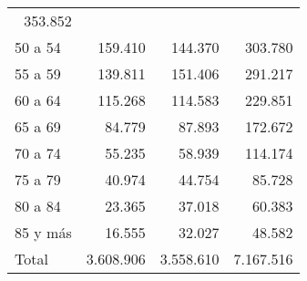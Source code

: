 \begin{tabular}{llll}
  \multicolumn{1}{r}{353.852} \\
\multicolumn{1}{l}{\hspace{1em}50 a 54} &
  \multicolumn{1}{|r}{159.410} &
  \multicolumn{1}{r}{144.370} &
  \multicolumn{1}{r}{303.780} \\
\multicolumn{1}{l}{\hspace{1em}55 a 59} &
  \multicolumn{1}{|r}{139.811} &
  \multicolumn{1}{r}{151.406} &
  \multicolumn{1}{r}{291.217} \\
\multicolumn{1}{l}{\hspace{1em}60 a 64} &
  \multicolumn{1}{|r}{115.268} &
  \multicolumn{1}{r}{114.583} &
  \multicolumn{1}{r}{229.851} \\
\multicolumn{1}{l}{\hspace{1em}65 a 69} &
  \multicolumn{1}{|r}{84.779} &
  \multicolumn{1}{r}{87.893} &
  \multicolumn{1}{r}{172.672} \\
\multicolumn{1}{l}{\hspace{1em}70 a 74} &
  \multicolumn{1}{|r}{55.235} &
  \multicolumn{1}{r}{58.939} &
  \multicolumn{1}{r}{114.174} \\
\multicolumn{1}{l}{\hspace{1em}75 a 79} &
  \multicolumn{1}{|r}{40.974} &
  \multicolumn{1}{r}{44.754} &
  \multicolumn{1}{r}{85.728} \\
\multicolumn{1}{l}{\hspace{1em}80 a 84} &
  \multicolumn{1}{|r}{23.365} &
  \multicolumn{1}{r}{37.018} &
  \multicolumn{1}{r}{60.383} \\
\multicolumn{1}{l}{\hspace{1em}85 y más} &
  \multicolumn{1}{|r}{16.555} &
  \multicolumn{1}{r}{32.027} &
  \multicolumn{1}{r}{48.582} \\
\multicolumn{1}{l}{\hspace{1em}Total} &
  \multicolumn{1}{|r}{3.608.906} &
  \multicolumn{1}{r}{3.558.610} &
  \multicolumn{1}{r}{7.167.516} \\
\cline{1-4}
\end{tabular}
